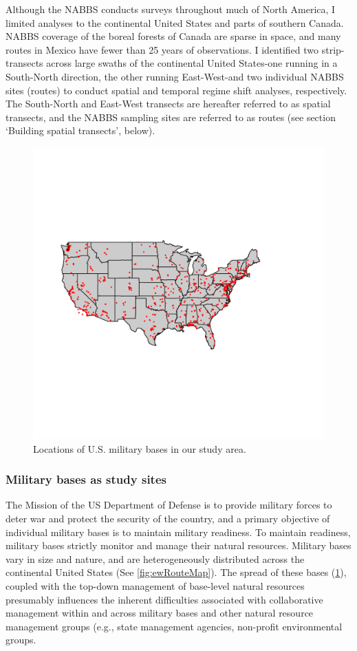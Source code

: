 \documentclass[12pt,twoside,openany]{reedthesis}
\begin{document}
Although the NABBS conducts surveys throughout much of North America, I limited analyses to the continental United States and parts of southern Canada. NABBS coverage of the boreal forests of Canada are sparse in space, and many routes in Mexico have fewer than 25 years of observations. I identified two strip-transects across large swaths of the continental United States-one running in a South-North direction, the other running East-West-and two individual NABBS sites (routes) to conduct spatial and temporal regime shift analyses, respectively. The South-North and East-West transects are hereafter referred to as spatial transects, and the NABBS sampling sites are referred to as routes (see section `Building spatial transects', below).
\begin{figure}

{\centering \includegraphics[width=0.85\linewidth]{./chapterFiles/fisherSpatial/figures/figsCalledInDiss/milBases} 

}

\caption{Locations of U.S. military bases in our study area.}\label{fig:milBases}
\end{figure}
\hypertarget{military-bases-as-study-sites}{%
\subsubsection{Military bases as study sites}\label{military-bases-as-study-sites}}

The Mission of the US Department of Defense is to provide military forces to deter war and protect the security of the country, and a primary objective of individual military bases is to maintain military readiness. To maintain readiness, military bases strictly monitor and manage their natural resources. Military bases vary in size and nature, and are heterogeneously distributed across the continental United States (See \ref{fig:ewRouteMap}). The spread of these bases (\ref{fig:milBases}), coupled with the top-down management of base-level natural resources presumably influences the inherent difficulties associated with collaborative management within and across military bases and other natural resource management groups (e.g., state management agencies, non-profit environmental groups.
\end{document}
